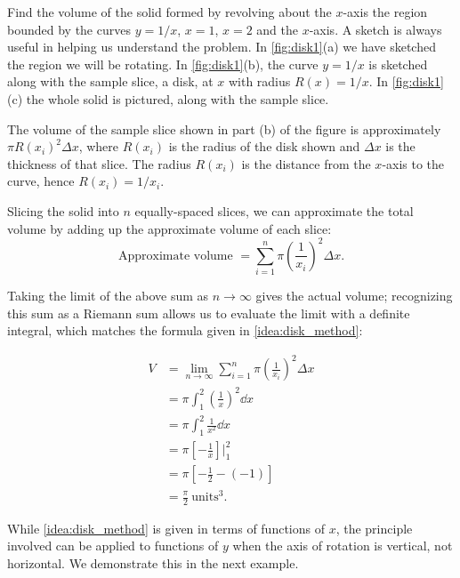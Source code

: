 \begin{example}\label{ex_disk1}%
Find the volume of the solid formed by revolving about the $x$-axis the region bounded by the curves $y=1/x$, $x=1$, $x=2$ and the $x$-axis.
\solution
A sketch is always useful in helping us understand the problem. In \autoref{fig:disk1}(a) we have sketched the region we will be rotating.  In \autoref{fig:disk1}(b), the curve $y=1/x$ is sketched along with the sample slice, a disk, at $x$ with radius $R(x)=1/x$. In \autoref{fig:disk1}(c) the whole solid is pictured, along with the sample slice.

The volume of the sample slice shown in part (b) of the figure is approximately $\pi R(x_i)^2\Delta x$, where $R(x_i)$ is the radius of the disk shown and $\Delta x$ is the thickness of that slice. The radius $R(x_i)$ is the distance from the $x$-axis to the curve, hence $R(x_i) = 1/x_i$.

Slicing the solid into $n$ equally-spaced slices, we can approximate the total volume by adding up the approximate volume of each slice:
\[\text{Approximate volume } = \sum_{i=1}^n \pi \left(\frac1{x_i}\right)^2\Delta x.\]

Taking the limit of the above sum as $n\to\infty$ gives the actual volume; recognizing this sum as a Riemann sum allows us to evaluate the limit with a definite integral, which matches the formula given in \autoref{idea:disk_method}:

\begin{align*}
	V &= \lim_{n\to\infty}\sum_{i=1}^n \pi \left(\frac1{x_i}\right)^2\Delta x\\
		&= \pi\int_1^2 \left(\frac1x\right)^2\dd x \\
		&= \pi\int_1^2 \frac1{x^2}\dd x \\
		&= \pi\left[-\frac1x\right]\Big|_1^2 \\
		&= \pi \left[-\frac12 - \left(-1\right)\right] \\
		&= \frac{\pi}{2}\ \text{units}^3.
\end{align*}
\end{example}

While \autoref{idea:disk_method} is given in terms of functions of $x$, the principle involved can be applied to functions of $y$ when the axis of rotation is vertical, not horizontal. We demonstrate this in the next example.

